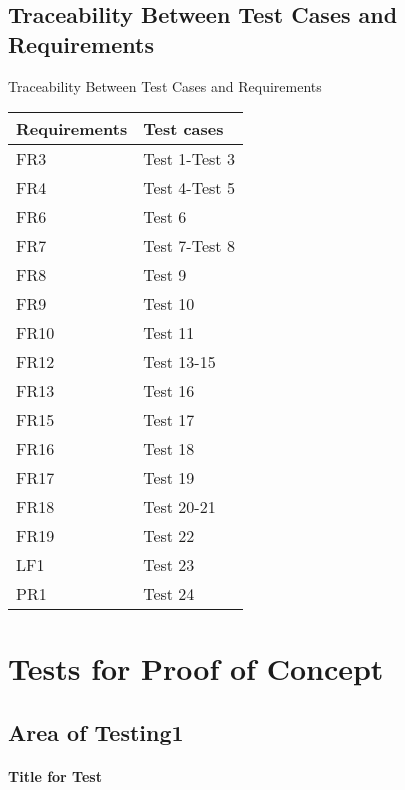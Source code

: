 \documentclass[12pt, titlepage]{article}
\begin{document}
\subsection{Traceability Between Test Cases and Requirements}
Traceability Between Test Cases and Requirements
\begin{table}[!htbp]
	\centering
	\begin{tabular}[r]{|l|l|}
		\hline
		\textbf{Requirements}& \textbf{Test cases} \\ \hline
		FR3 & Test 1-Test 3 \\ \hline
		FR4 & Test 4-Test 5 \\ \hline
		FR6 & Test 6 \\ \hline
		FR7 & Test 7-Test 8  \\ \hline
		FR8 & Test 9 \\ \hline
		FR9 & Test 10 \\ \hline
		FR10 & Test 11 \\ \hline
		FR12 & Test 13-15 \\ \hline
		FR13 & Test 16 \\	\hline
		FR15 & Test 17 \\ \hline
		FR16 & Test 18 \\ \hline
		FR17 & Test 19 \\ \hline
		FR18 & Test 20-21 \\ \hline
		FR19 & Test 22 \\ \hline
		LF1 & Test 23 \\ \hline
		PR1 & Test 24 \\ \hline
	\end{tabular}
\end{table}
\section{Tests for Proof of Concept}

\subsection{Area of Testing1}

\paragraph{Title for Test}
\end{document}

